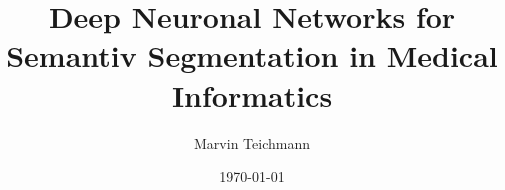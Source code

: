 \documentclass[11pt, a4paper,twocolumn]{IEEEtran} %
\title{Deep Neuronal Networks for Semantiv Segmentation in Medical Informatics}
\author{Marvin Teichmann}
\date{\today}
\begin{document}
\maketitle








%


\newpage


\printglossaries%
\end{document}
